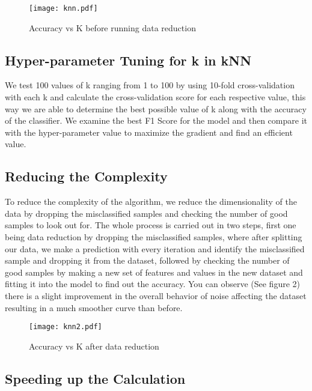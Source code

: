 \documentclass{article}
\begin{document}
\begin{figure}[ht]
\vskip 0.1in
\begin{center}
\centerline{\texttt{[image: knn.pdf]}}
\caption{Accuracy vs K before running data reduction}
\label{icml-historical}
\end{center}
\vskip -0.2in
\end{figure}
\subsection{Hyper-parameter Tuning for k in kNN}
We test 100 values of k ranging from 1 to 100 by using 10-fold cross-validation with each k and calculate the cross-validation score for each respective value, this way we are able to determine the best possible value of k along with the accuracy of the classifier.
We examine the best F1 Score for the model and then compare it with the hyper-parameter value to maximize the gradient and find an efficient value.

\subsection{Reducing the Complexity}
To reduce the complexity of the algorithm, we reduce the dimensionality of the data by dropping the misclassified samples and checking the number of good samples to look out for. The whole process is carried out in two steps, first one being data reduction by dropping the misclassified samples, where after splitting our data, we make a prediction with every iteration and identify the misclassified sample and dropping it from the dataset, followed by checking the number of good samples by making a new set of features and values in the new dataset and fitting it into the model to find out the accuracy. You can observe (See figure 2) there is a slight improvement in the overall behavior of noise affecting the dataset resulting in a much smoother curve than before.
\begin{figure}[ht]
\vskip 0.1in
\begin{center}
\centerline{\texttt{[image: knn2.pdf]}}
\caption{Accuracy vs K after data reduction}
\label{icml-historical}
\end{center}
\vskip -0.2in
\end{figure}

\subsection{Speeding up the Calculation}
\end{document}
